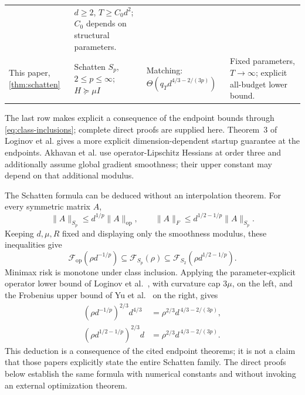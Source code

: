 \documentclass[11pt,a4paper]{article}
\newcommand{\op}{\mathrm{op}}
\theoremstyle{definition}
\theoremstyle{remark}
\begin{document}
\begin{table}[!htbp]
\begin{tabularx}{\textwidth}{@{}>{\raggedright\arraybackslash}p{}>{\raggedright\arraybackslash}p{}>{\raggedright\arraybackslash}p{}>{\raggedright\arraybackslash}X@{}}
& $d\ge2$, $T\ge C_0d^2$; $C_0$ depends on structural parameters. \\
\addlinespace[5pt]
This paper,\newline \cref{thm:schatten}
& Schatten $S_p$, $2\le p\le\infty$; $H\succeq\mu I$
& Matching:\newline $\Theta(q_Td^{4/3-2/(3p)})$
& Fixed parameters, $T\to\infty$; explicit all-budget lower bound. \\
\bottomrule
\end{tabularx}
\par\vspace{6pt}
\begin{minipage}{\textwidth}
\footnotesize
The last row makes explicit a consequence of the endpoint bounds through \eqref{eq:class-inclusions}; complete direct proofs are supplied here. Theorem~3 of Loginov et al. gives a more explicit dimension-dependent startup guarantee at the endpoints. Akhavan et al. use operator-Lipschitz Hessians at order three and additionally assume global gradient smoothness; their upper constant may depend on that additional modulus.
\end{minipage}
\end{table}

The Schatten formula can be deduced without an interpolation theorem. For every symmetric matrix $A$,
\[
 \|A\|_{S_p}\le d^{1/p}\|A\|_{\op},
 \qquad
 \|A\|_F\le d^{1/2-1/p}\|A\|_{S_p}.
\]
Keeping $d,\mu,R$ fixed and displaying only the smoothness modulus, these inequalities give
\begin{equation}\label{eq:class-inclusions}
 \mathcal F_{\op}(\rho d^{-1/p})
 \subseteq\mathcal F_{S_p}(\rho)
 \subseteq\mathcal F_{S_2}(\rho d^{1/2-1/p}).
\end{equation}
Minimax risk is monotone under class inclusion. Applying the parameter-explicit operator lower bound of Loginov et al.~\cite[Theorem~1(b)]{Loginov2026}, with curvature cap $3\mu$, on the left, and the Frobenius upper bound of Yu et al.~\cite[Theorem~3.1]{Yu2024} on the right, gives
\begin{align*}
 (\rho d^{-1/p})^{2/3}d^{4/3}
 &=\rho^{2/3}d^{\,4/3-2/(3p)},\\
 (\rho d^{1/2-1/p})^{2/3}d
 &=\rho^{2/3}d^{\,4/3-2/(3p)}.
\end{align*}
This deduction is a consequence of the cited endpoint theorems; it is not a claim that those papers explicitly state the entire Schatten family. The direct proofs below establish the same formula with numerical constants and without invoking an external optimization theorem.
\end{document}
